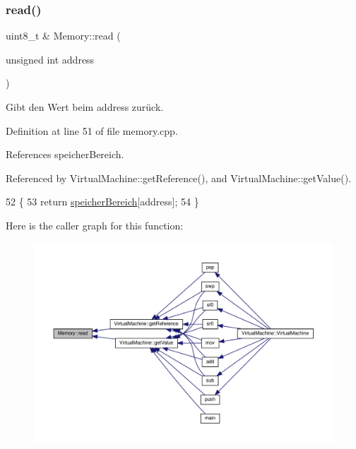 \subsubsection{\texorpdfstring{read()}{read()}}
{\footnotesize\ttfamily uint8\+\_\+t \& Memory\+::read (\begin{DoxyParamCaption}\item[{unsigned int}]{address }\end{DoxyParamCaption})}

Gibt den Wert beim {\ttfamily address} zurück. 

Definition at line 51 of file memory.\+cpp.



References speicher\+Bereich.



Referenced by Virtual\+Machine\+::get\+Reference(), and Virtual\+Machine\+::get\+Value().


\begin{DoxyCode}
52 \{
53     \textcolor{keywordflow}{return} \mbox{\hyperlink{class_memory_a31e171332b705e39bb13e421c7863a5f}{speicherBereich}}[address];
54 \}
\end{DoxyCode}
Here is the caller graph for this function\+:
\nopagebreak
\begin{figure}[H]
\begin{center}
\leavevmode
\includegraphics[width=350pt]{class_memory_ab669beeca09308c880af9b13cde7f655_icgraph}
\end{center}
\end{figure}
\mbox{\label{class_memory_a274d126eea46f966a36a2eb69da949ab}} 
